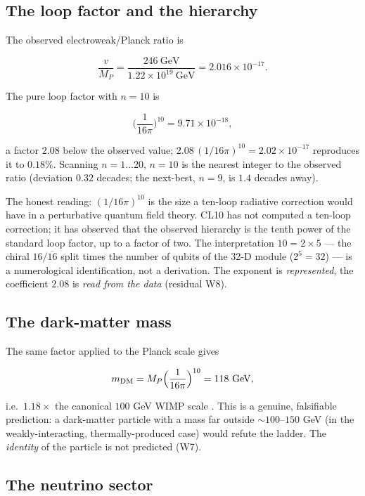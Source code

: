 \documentclass[aps,prd,twocolumn,amsmath,amssymb,superscriptaddress,nofootinbib,floatfix]{revtex4-2}
\begin{document}
\subsection{The loop factor and the
hierarchy}\label{the-loop-factor-and-the-hierarchy}

The observed electroweak/Planck ratio is

\[\frac{v}{M_P} = \frac{246\ \mathrm{GeV}}{1.22\times10^{19}\ \mathrm{GeV}} = 2.016\times10^{-17}.\]

The pure loop factor with \(n = 10\) is

\[\Big(\frac{1}{16\pi}\Big)^{10} = 9.71\times10^{-18},\]

a factor \(2.08\) below the observed value;
\(2.08\,(1/16\pi)^{10} = 2.02\times10^{-17}\) reproduces it to
\(0.18\%\). Scanning \(n = 1\dots20\), \(n = 10\) is the nearest integer
to the observed ratio (deviation \(0.32\) decades; the next-best,
\(n = 9\), is \(1.4\) decades away).

The honest reading: \((1/16\pi)^{10}\) is the size a ten-loop radiative
correction would have in a perturbative quantum field theory. CL10 has
not computed a ten-loop correction; it has observed that the observed
hierarchy is the tenth power of the standard loop factor, up to a factor
of two. The interpretation \(10 = 2\times 5\) --- the chiral
\(16/\overline{16}\) split times the number of qubits of the 32-D module
(\(2^5 = 32\)) --- is a numerological identification, not a derivation.
The exponent is \emph{represented}, the coefficient \(2.08\) is
\emph{read from the data} (residual W8).

\subsection{The dark-matter mass}\label{the-dark-matter-mass}

The same factor applied to the Planck scale gives

\[m_{\rm DM} = M_P\Big(\frac{1}{16\pi}\Big)^{10} = 118\ \mathrm{GeV},\]

i.e.~\(1.18\times\) the canonical \(100\) GeV WIMP scale \cite{ref45}.
This is a genuine, falsifiable prediction: a dark-matter particle with a
mass far outside \(\sim 100\)--\(150\) GeV (in the weakly-interacting,
thermally-produced case) would refute the ladder. The \emph{identity} of
the particle is not predicted (W7).

\subsection{The neutrino sector}\label{the-neutrino-sector}
\end{document}
